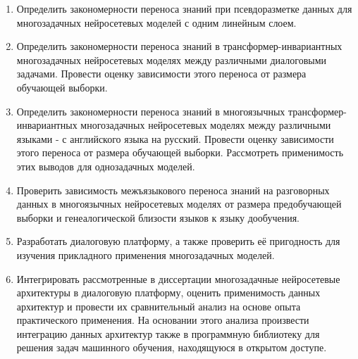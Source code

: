 \begin{enumerate}
  \item {Определить закономерности переноса знаний при псевдоразметке данных для многозадачных нейросетевых моделей с одним линейным слоем.}
  \item {Определить закономерности переноса знаний в трансформер-инвариантных многозадачных нейросетевых моделях между различными диалоговыми задачами. Провести оценку зависимости этого переноса от размера обучающей выборки.}
  \item {Определить закономерности переноса знаний в многоязычных трансформер-инвариантных многозадачных нейросетевых моделях между различными языками - с английского языка на русский. Провести оценку зависимости этого переноса от размера обучающей выборки. Рассмотреть применимость этих выводов для однозадачных моделей.}
  \item {Проверить зависимость межъязыкового переноса знаний на разговорных данных в многоязычных нейросетевых моделях от размера предобучающей выборки и генеалогической близости языков к языку дообучения.}
  \item {Разработать диалоговую платформу, а также проверить её пригодность для изучения прикладного применения многозадачных моделей.} %
  \item {Интегрировать рассмотренные в диссертации многозадачные нейросетевые архитектуры в диалоговую платформу, оценить применимость данных архитектур и провести их сравнительный анализ на основе опыта практического применения. На основании этого анализа произвести интеграцию данных архитектур также в программную библиотеку для решения задач машинного обучения, находящуюся в открытом доступе.}%
  \newline
  \newline
\end{enumerate}


